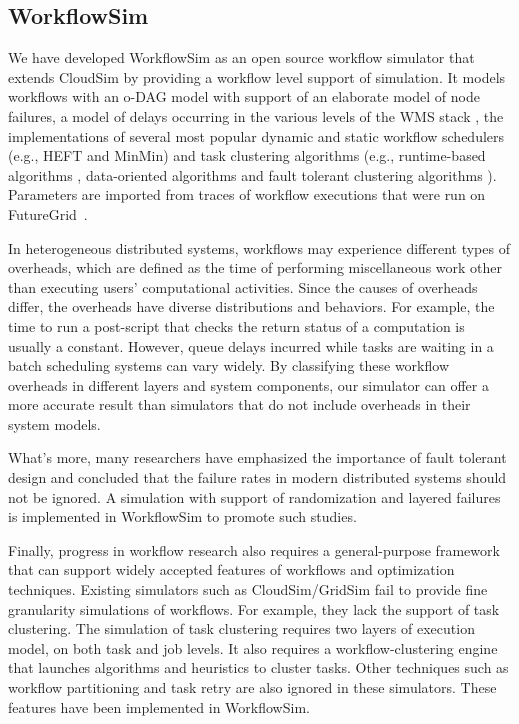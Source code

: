 \subsection{WorkflowSim}

We have developed WorkflowSim as an open source workflow simulator that extends CloudSim \cite{Calheiros2011} by providing a workflow level support of simulation. It models workflows with an o-DAG model with support of an elaborate model of node failures, a model of delays occurring in the various levels of the WMS stack \cite{Chen2011}, the implementations of several most popular dynamic and static workflow schedulers (e.g., HEFT\cite{Topcuoglu2002} and MinMin\cite{Blythe2005}) and task clustering algorithms (e.g., runtime-based algorithms \cite{Chen2013b}, data-oriented algorithms \cite{Chen2013b} and fault tolerant clustering algorithms \cite{Chen2012}). Parameters are imported from traces of workflow executions that were run on FutureGrid~\cite{Fox2013FutureGrid}. 

In heterogeneous distributed systems, workflows may experience different types of overheads, which are defined as the time of performing miscellaneous work other than executing users’ computational activities.  Since the causes of overheads differ, the overheads have diverse distributions and behaviors. For example, the time to run a post-script that checks the return status of a computation is usually a constant. However, queue delays incurred while tasks are waiting in a batch scheduling systems can vary widely. 
By classifying these workflow overheads in different layers and system components, our simulator can offer a more accurate result than simulators that do not include overheads in their system models.

What’s more, many researchers \cite{Zhang2004, Tang1990, Schroeder2006, Sahoo2004, Oppenheimer2002, McConnel1979} have emphasized the importance of fault tolerant design and concluded that the failure rates in modern distributed systems should not be ignored. A simulation with support of randomization and layered failures is implemented in WorkflowSim to promote such studies. 

Finally, progress in workflow research also requires a general-purpose framework that can support widely accepted features of workflows and optimization techniques. Existing simulators such as CloudSim/GridSim \cite{Calheiros2011} fail to provide fine granularity simulations of workflows. For example, they lack the support of task clustering. The simulation of task clustering requires two layers of execution model, on both task and job levels. It also requires a workflow-clustering engine that launches algorithms and heuristics to cluster tasks. Other techniques such as workflow partitioning and task retry are also ignored in these simulators. These features have been implemented in WorkflowSim. 

